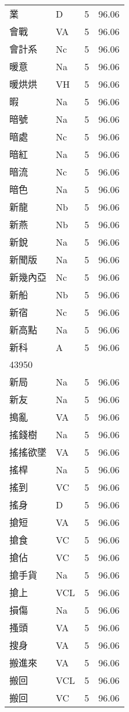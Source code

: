 \documentclass[twocolumn]{book}
\begin{document}
\begin{supertabular}{llrr}
業 & D & 5 &  96.06\\
會戰 & VA & 5 &  96.06\\
會計系 & Nc & 5 &  96.06\\
暖意 & Na & 5 &  96.06\\
暖烘烘 & VH & 5 &  96.06\\
暇 & Na & 5 &  96.06\\
暗號 & Na & 5 &  96.06\\
暗處 & Nc & 5 &  96.06\\
暗紅 & Na & 5 &  96.06\\
暗流 & Nc & 5 &  96.06\\
暗色 & Na & 5 &  96.06\\
新龍 & Nb & 5 &  96.06\\
新燕 & Nb & 5 &  96.06\\
新銳 & Na & 5 &  96.06\\
新聞版 & Na & 5 &  96.06\\
新幾內亞 & Nc & 5 &  96.06\\
新船 & Nb & 5 &  96.06\\
新宿 & Nc & 5 &  96.06\\
新高點 & Na & 5 &  96.06\\
新科 & A & 5 &  96.06\\
43950\\
新局 & Na & 5 &  96.06\\
新友 & Na & 5 &  96.06\\
搗亂 & VA & 5 &  96.06\\
搖錢樹 & Na & 5 &  96.06\\
搖搖欲墜 & VA & 5 &  96.06\\
搖桿 & Na & 5 &  96.06\\
搖到 & VC & 5 &  96.06\\
搖身 & D & 5 &  96.06\\
搶短 & VA & 5 &  96.06\\
搶食 & VC & 5 &  96.06\\
搶佔 & VC & 5 &  96.06\\
搶手貨 & Na & 5 &  96.06\\
搶上 & VCL & 5 &  96.06\\
損傷 & Na & 5 &  96.06\\
搔頭 & VA & 5 &  96.06\\
搜身 & VA & 5 &  96.06\\
搬進來 & VA & 5 &  96.06\\
搬回 & VCL & 5 &  96.06\\
搬回 & VC & 5 &  96.06\\

\end{supertabular}
\end{document}

